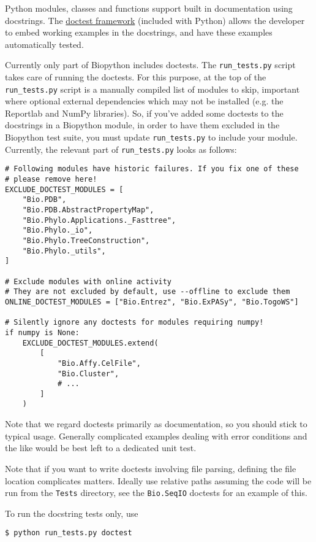 Python modules, classes and functions support built in documentation using
docstrings.  The \href{https://docs.python.org/3/library/doctest.html}{doctest
framework} (included with Python) allows the developer to embed working
examples in the docstrings, and have these examples automatically tested.

Currently only part of Biopython includes doctests. The \verb|run_tests.py|
script takes care of running the doctests. For this purpose, at the top of
the \verb|run_tests.py| script is a manually compiled list of modules to
skip, important where optional external dependencies which may
not be installed (e.g. the Reportlab and NumPy libraries).  So, if you've
added some doctests to the docstrings in a Biopython module, in order to
have them excluded in the Biopython test suite, you must update
\verb|run_tests.py| to include your module. Currently, the relevant part
of \verb|run_tests.py| looks as follows:

\begin{verbatim}
# Following modules have historic failures. If you fix one of these
# please remove here!
EXCLUDE_DOCTEST_MODULES = [
    "Bio.PDB",
    "Bio.PDB.AbstractPropertyMap",
    "Bio.Phylo.Applications._Fasttree",
    "Bio.Phylo._io",
    "Bio.Phylo.TreeConstruction",
    "Bio.Phylo._utils",
]

# Exclude modules with online activity
# They are not excluded by default, use --offline to exclude them
ONLINE_DOCTEST_MODULES = ["Bio.Entrez", "Bio.ExPASy", "Bio.TogoWS"]

# Silently ignore any doctests for modules requiring numpy!
if numpy is None:
    EXCLUDE_DOCTEST_MODULES.extend(
        [
            "Bio.Affy.CelFile",
            "Bio.Cluster",
            # ...
        ]
    )
\end{verbatim}

Note that we regard doctests primarily as documentation, so you should
stick to typical usage. Generally complicated examples dealing with error
conditions and the like would be best left to a dedicated unit test.

Note that if you want to write doctests involving file parsing, defining
the file location complicates matters.  Ideally use relative paths assuming
the code will be run from the \verb|Tests| directory, see the
\verb|Bio.SeqIO| doctests for an example of this.

To run the docstring tests only, use
\begin{verbatim}
$ python run_tests.py doctest
\end{verbatim}

